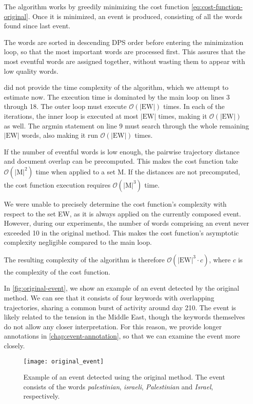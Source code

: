 The algorithm works by greedily minimizing the cost function \eqref{eq:cost-function-original}. Once it is minimized, an event is produced, consisting of all the words found since last event.

The words are sorted in descending DPS order before entering the minimization loop, so that the most important words are processed first. This assures that the most eventful words are assigned together, without wasting them to appear with low quality words.

\cite{event-detection} did not provide the time complexity of the algorithm, which we attempt to estimate now. The execution time is dominated by the main loop on lines 3 through 18. The outer loop must execute $\mathcal{O}(|\text{EW}|)$ times. In each of the iterations, the inner loop is executed at most $|\text{EW}|$ times, making it $\mathcal{O}(|\text{EW}|)$ as well. The argmin statement on line 9 must search through the whole remaining $|\text{EW}|$ words, also making it run $\mathcal{O}(|\text{EW}|)$ times.

If the number of eventful words is low enough, the pairwise trajectory distance and document overlap can be precomputed. This makes the cost function take $\mathcal{O}(|\text{M}|^{2})$ time when applied to a set M. If the distances are not precomputed, the cost function execution requires $\mathcal{O}(|\text{M}|^{3})$ time.

We were unable to precisely determine the cost function's complexity with respect to the set EW, as it is always applied on the currently composed event. However, during our experiments, the number of words comprising an event never exceeded 10 in the original method. This makes the cost function's asymptotic complexity negligible compared to the main loop.

The resulting complexity of the algorithm is therefore $\mathcal{O}(|\text{EW}|^{3} \cdot c)$, where $c$ is the complexity of the cost function.


In \autoref{fig:original-event}, we show an example of an event detected by the original method. We can see that it consists of four keywords with overlapping trajectories, sharing a common burst of activity around day 210. The event is likely related to the tension in the Middle East, though the keywords themselves do not allow any closer interpretation. For this reason, we provide longer annotations in \autoref{chap:event-annotation}, so that we can examine the event more closely.


\begin{figure}
  \centering
  \texttt{[image: original\_event]}  %
  \caption{Example of an event detected using the original method. The event consists of the words \textit{palestinian}, \textit{israeli}, \textit{Palestinian} and \textit{Israel}, respectively.}
  \label{fig:original-event}
\end{figure}


